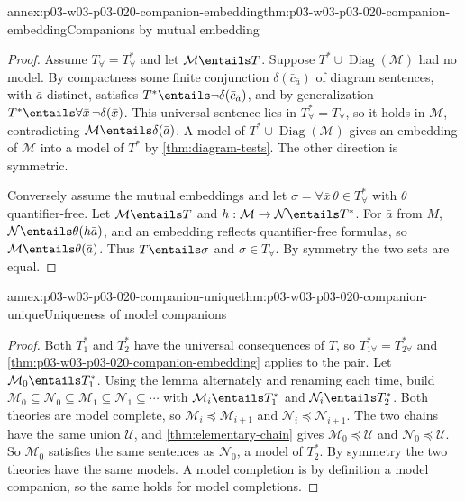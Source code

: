 \begin{annexitem}{annex:p03-w03-p03-020-companion-embedding}{thm:p03-w03-p03-020-companion-embedding}{Companions by mutual embedding}
\begin{proof}
Assume \(T_\forall=T^*_\forall\) and let \(\mathcal M\entails T\). Suppose
\(T^*\cup\operatorname{Diag}(\mathcal M)\) had no model. By compactness
some finite conjunction \(\delta(\bar c_{\bar a})\) of diagram sentences, with
\(\bar a\) distinct, satisfies \(T^*\entails\neg\delta(\bar c_{\bar a})\), and
by generalization \(T^*\entails\forall\bar x\,\neg\delta(\bar x)\). This
universal sentence lies in \(T^*_\forall=T_\forall\), so it holds in
\(\mathcal M\), contradicting \(\mathcal M\entails\delta(\bar a)\). A model
of \(T^*\cup\operatorname{Diag}(\mathcal M)\) gives an embedding of
\(\mathcal M\) into a model of \(T^*\) by \cref{thm:diagram-tests}. The
other direction is symmetric.

Conversely assume the mutual embeddings and let
\(\sigma=\forall\bar x\,\theta\in T^*_\forall\) with \(\theta\)
quantifier-free. Let \(\mathcal M\entails T\) and
\(h:\mathcal M\to\mathcal N\entails T^*\). For \(\bar a\) from \(M\),
\(\mathcal N\entails\theta(h\bar a)\), and an embedding reflects
quantifier-free formulas, so \(\mathcal M\entails\theta(\bar a)\). Thus
\(T\entails\sigma\) and \(\sigma\in T_\forall\). By symmetry the two sets
are equal.
\end{proof}
\end{annexitem}

\begin{annexitem}{annex:p03-w03-p03-020-companion-unique}{thm:p03-w03-p03-020-companion-unique}{Uniqueness of model companions}
\begin{proof}
Both \(T_1^*\) and \(T_2^*\) have the universal consequences of \(T\), so
\(T_{1\forall}^*=T_{2\forall}^*\) and
\cref{thm:p03-w03-p03-020-companion-embedding} applies to the pair. Let
\(\mathcal M_0\entails T_1^*\). Using the lemma alternately and renaming
each time, build
\(\mathcal M_0\subseteq\mathcal N_0\subseteq\mathcal M_1\subseteq
\mathcal N_1\subseteq\cdots\) with \(\mathcal M_i\entails T_1^*\) and
\(\mathcal N_i\entails T_2^*\). Both theories are model complete, so
\(\mathcal M_i\preccurlyeq\mathcal M_{i+1}\) and
\(\mathcal N_i\preccurlyeq\mathcal N_{i+1}\). The two chains have the same
union \(\mathcal U\), and \cref{thm:elementary-chain} gives
\(\mathcal M_0\preccurlyeq\mathcal U\) and
\(\mathcal N_0\preccurlyeq\mathcal U\). So \(\mathcal M_0\) satisfies the
same sentences as \(\mathcal N_0\), a model of \(T_2^*\). By symmetry the
two theories have the same models. A model completion is by definition a
model companion, so the same holds for model completions.
\end{proof}
\end{annexitem}

